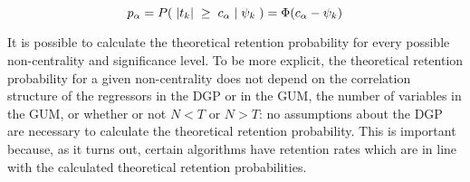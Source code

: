 \documentclass[11pt, oneside]{book}   	%
\begin{document}
$$ p_{\alpha} = P( \hspace{0.1cm}|t_{k}| \hspace{0.1cm} \geq \hspace{0.1cm} c_{\alpha} \hspace{0.1cm} | \hspace{0.1cm}\psi_{k}\hspace{0.1cm}) = \Phi({c_{\alpha}-\psi_{k}})$$

It is possible to calculate the theoretical retention probability for every possible non-centrality and significance level. To be more explicit, the theoretical retention probability for a given non-centrality does not depend on the correlation structure of the regressors in the DGP or in the GUM, the number of variables in the GUM, or whether or not $N<T$ or $N>T$: no assumptions about the DGP are necessary to calculate the theoretical retention probability. This is important because, as it turns out, certain algorithms have retention rates which are in line with the calculated theoretical retention probabilities. 



\end{document}

